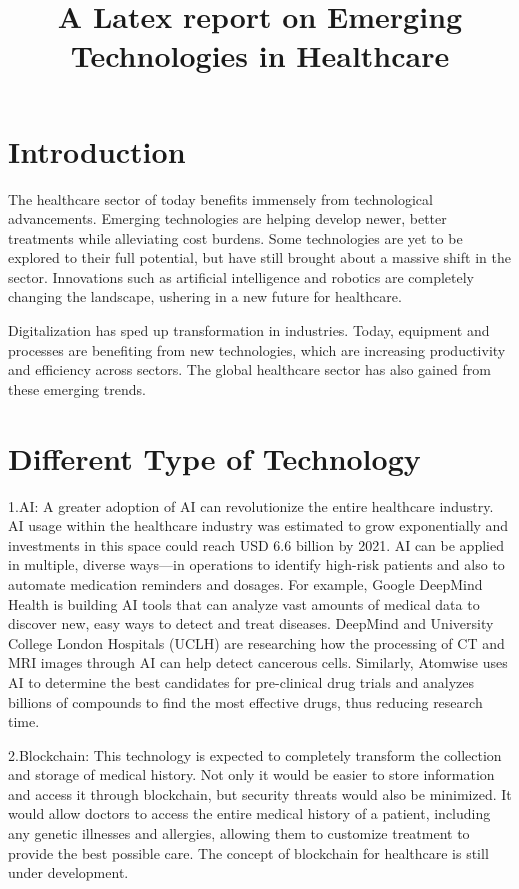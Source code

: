 \documentclass[12pt]{article}
\begin{document}
\title{A Latex report on Emerging Technologies in Healthcare}
\maketitle{}

\section{Introduction}
The healthcare sector of today benefits immensely from technological advancements. Emerging technologies are helping develop newer, better treatments while alleviating cost burdens. Some technologies are yet to be explored to their full potential, but have still brought about a massive shift in the sector. Innovations such as artificial intelligence and robotics are completely changing the landscape, ushering in a new future for healthcare.

Digitalization has sped up transformation in industries. Today, equipment and processes are benefiting from new technologies, which are increasing productivity and efficiency across sectors. The global healthcare sector has also gained from these emerging trends. 

\section{Different Type of Technology}
1.AI: A greater adoption of AI can revolutionize the entire healthcare industry. AI usage within the healthcare industry was estimated to grow exponentially and investments in this space could reach USD 6.6 billion by 2021. AI can be applied in multiple, diverse ways—in operations to identify high-risk patients and also to automate medication reminders and dosages. For example, Google DeepMind Health is building AI tools that can analyze vast amounts of medical data to discover new, easy ways to detect and treat diseases. DeepMind and University College London Hospitals (UCLH) are researching how the processing of CT and MRI images through AI can help detect cancerous cells. Similarly, Atomwise uses AI to determine the best candidates for pre-clinical drug trials and analyzes billions of compounds to find the most effective drugs, thus reducing research time.

2.Blockchain: This technology is expected to completely transform the collection and storage of medical history. Not only it would be easier to store information and access it through blockchain, but security threats would also be minimized. It would allow doctors to access the entire medical history of a patient, including any genetic illnesses and allergies, allowing them to customize treatment to provide the best possible care. The concept of blockchain for healthcare is still under development.
\end{document}
